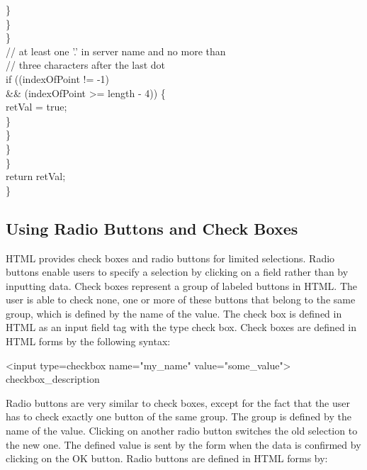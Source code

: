 \begin{java}
\jtabf                                                \}\\
\jtabf                                        \}\\
\jtabe                                \}\\
\jtabf                  // at least one '.' in server name and no more than\\
\jtabf                  // three characters after the last dot\\
\jtabe                                if ((indexOfPoint != -1)\\
\jtabe                    \&\& (indexOfPoint >= length - 4)) \{\\
\jtabf                                        retVal = true;\\
\jtabe                                \}\\
\jtabd                        \}\\
\jtabc                \}\\
\jtabb        \}\\
return retVal;\\
\}\\
\end{java}

\subsection{Using Radio Buttons and Check Boxes}
HTML provides check boxes and radio buttons for limited selections.
Radio buttons enable users to specify a selection by clicking on a field
rather than by inputting data. Check boxes represent a group of labeled
buttons in HTML. The user is able to check none, one or more of these
buttons that belong to the same group, which is defined by the name of
the value. The check box is defined in HTML as an input field tag with
the type check box. Check boxes are defined in HTML forms by the
following syntax:

\begin{java}
<input  type=checkbox name="my\_name" value="some\_value">
checkbox\_description
\end{java}

Radio buttons are very similar to check boxes, except for the fact that
the user has to check exactly one button of the same group. The group is
defined by the name of the value. Clicking on another radio button
switches the old selection to the new one. The defined value is sent by
the form when the data is confirmed by clicking on the OK button. Radio
buttons are defined in HTML forms by:

